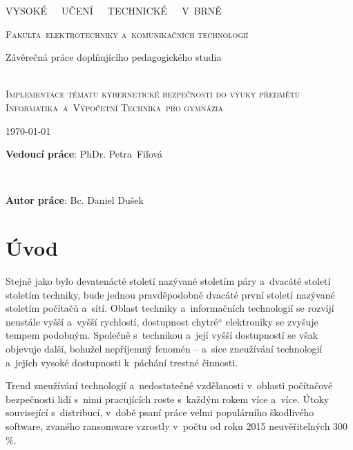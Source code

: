 \documentclass[a4paper, 12pt]{article}
\title{\thesisname}
\author{Bc. Daniel Dušek}
\providecommand{\uv}[1]{\quotedblbase #1\textquotedblleft}
\newcommand\textbox[1]{%
    \parbox{.5\textwidth}{#1}%
}
\newcommand{\thesisName}{Implementace tématu kybernetické bezpečnosti do výuky předmětu Informatika~a~Výpočetní Technika~pro gymnázia}
\newcommand{\universityName}{VYSOKÉ~~~UČENÍ~~~TECHNICKÉ~~~V~BRNĚ}
\newcommand{\facultyName}{Fakulta~elektrotechniky a~komunikačních technologií}
\begin{document}
\thispagestyle{empty}
    \begin{center}
        \Huge
        \universityName \\
        
        \LARGE
        \textsc{\facultyName\\}
        
        \Large{Závěrečná práce doplňujícího pedagogického studia~\\ ~ \\}
        
        \LARGE
        \textsc{\thesisName}
    \end{center}

        \noindent \textbox{\today}  \textbox{\hfill \textbf{Vedoucí práce}: PhDr. Petra~Fiľová} \\
        \noindent \textbox{\hfill}  \textbox{\hfill \textbf{Autor práce}: Bc. Daniel Dušek ~~~~~}
\clearpage
\restoregeometry

\newpage
\thispagestyle{empty}
\setcounter{tocdepth}{2}
\tableofcontents

\newpage
\setcounter{page}{1}
\section{Úvod}

Stejně jako bylo devatenácté století nazývané stoletím páry a~dvacáté století stoletím techniky, bude jednou pravděpodobně dvacáté první století nazývané stoletím počítačů a~sítí. Oblast techniky a~informačních technologií se rozvíjí neustále vyšší a~vyšší rychlostí, dostupnost \uv{chytré} elektroniky se zvyšuje tempem podobným. Společně s~technikou a~její vyšší dostupností se však objevuje další, bohužel nepříjemný fenomén -- a~sice zneužívání technologií a~jejich vysoké dostupnosti k~páchání trestné činnosti. 

Trend zneužívání technologií a~nedostatečné vzdělanosti v~oblasti počítačové bezpečnosti lidí s~nimi pracujících roste s~každým rokem více a~více. Útoky související s~distribucí, v~době psaní práce velmi populárního škodlivého software, zvaného ransomware vzrostly v~počtu od roku 2015 neuvěřitelných 300$\%$.
\end{document}

